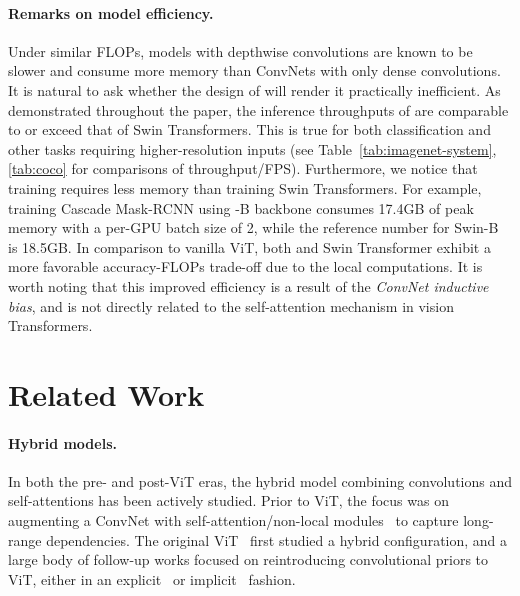 \paragraph{Remarks on model efficiency.} Under similar FLOPs, models with depthwise convolutions are known to be slower and consume more memory than ConvNets with only dense convolutions. It is natural to ask whether the design of \cnn{} will render it practically inefficient. As demonstrated throughout the paper, the inference throughputs of  are comparable to or exceed that of Swin Transformers. This is true for both classification and other tasks requiring higher-resolution inputs (see Table~\ref{tab:imagenet-system},\ref{tab:coco} for comparisons of throughput/FPS). Furthermore, we notice that training  requires less memory than training Swin Transformers. For example, training Cascade Mask-RCNN using \cnn{}-B backbone consumes 17.4GB of peak memory with a per-GPU batch size of 2, while the reference number for Swin-B is 18.5GB.
In comparison to vanilla ViT, both \cnn{} and Swin Transformer exhibit a more favorable accuracy-FLOPs trade-off due to the local computations. It is worth noting that this improved efficiency is a result of the \emph{ConvNet inductive bias}, and is not directly related to the self-attention mechanism in vision Transformers.


\section{Related Work}
\paragraph{Hybrid models.} 
In both the pre- and post-ViT eras, the hybrid model combining convolutions and self-attentions has been actively studied. 
Prior to ViT, the focus was on augmenting a ConvNet with self-attention/non-local modules~\cite{Wang2018,bello2019attention,srinivas2021bottleneck,ramachandran2019stand} to capture long-range dependencies.
The original ViT~\cite{Dosovitskiy2021} first studied a hybrid configuration, and a large body of follow-up works focused on reintroducing convolutional priors to ViT, either in an explicit~\cite{wu2021cvt, xu2021co, d2021convit, dai2021coatnet,Xiao2021, fan2021multiscale} or implicit~\cite{Liu2021swin} fashion.

